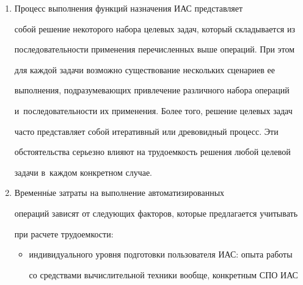 \begin{enumerate}[1.]
      В конкретной ИАС данный перечень может меняться или уточняться.


      


      Автоматизированные операции проводятся с~участием пользователей 


ИАС и~связаны с~действиями, требующими осмысленного вмешательства 


человека при вводе и~обработке разнородной информации, а также принятии 


решений. Автоматические операции в~полном объеме выполняются 


программным обеспечением ИАС без ка\-ко\-го-либо участия пользователей 


и~связаны с~приемом, обработкой и~хранением информации.


      


      \item Процесс выполнения функций назначения ИАС представляет 


собой решение некоторого набора целевых задач, который складывается из 


последовательности применения перечисленных выше операций. При этом 


для каждой задачи возможно существование нескольких сценариев ее 


выполнения, подразумевающих привлечение различного набора операций 


и~последовательности их применения. Более того, решение целевых задач 


часто представляет собой итеративный или древовидный процесс. Эти 


обстоятельства серьезно влияют на трудоемкость решения любой целевой 


задачи в~каждом конкретном случае.


      \item Временн$\acute{\mbox{ы}}$е затраты на выполнение автоматизированных 


операций зависят от следующих факторов, которые предлагается учитывать 


при расчете трудоемкости:


      \begin{itemize}


\item индивидуального уровня подготовки пользователя ИАС: опыта работы 


со средствами вычислительной техники вообще, конкретным СПО ИАС 



\end{itemize}
\end{enumerate}

